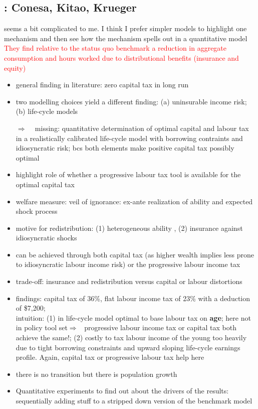 \documentclass[12pt]{article}
\newcommand{\ar}{$\Rightarrow$ \ }
\newcommand{\tr}[1]{\textcolor{red}{#1}}
\begin{document}
\subsection{\cite{Conesa2009TaxingAll}: Conesa, Kitao, Krueger
} \textcolor{sonja}{seems a bit complicated to me. I think I prefer simpler models to highlight one mechanism and then see how the mechanism spells out in a quantitative model}\\
\tr{They find relative to the status quo benchmark a reduction in aggregate consumption and hours worked due to distributional benefits (insurance and equity)}
\begin{itemize}
\item general finding in literature: zero capital tax in long run
\item two modelling choices yield a different finding: (a) uninsurable income risk; (b) life-cycle models
\item[\ar] missing: quantitative determination of optimal capital and labour tax in a realistically calibrated life-cycle model with borrowing contraints and idiosyncratic risk; bcs both elements make positive capital tax possibly optimal
\item highlight role of whether a progressive labour tax tool is available for the optimal capital tax
\item welfare measure: veil of ignorance: ex-ante realization of ability and expected shock process
\item motive for redistribution: (1) heterogeneous ability , (2) insurance against idiosyncratic shocks
\item can be achieved through both capital tax (as higher wealth implies less prone to idiosyncratic labour income risk) or the progressive labour income tax
\item trade-off: insurance and redistribution versus capital or labour distortions
\item findings: capital tax of 36\%, flat labour income tax of 23\% with a deduction of \$7,200; \\
intuition: (1) in life-cycle model optimal to base labour tax on \textbf{age}; here not in policy tool set\ar progressive labour income tax or capital tax both achieve the same!;  (2) costly to tax labour income of the young too heavily due to tight borrowing constraints and upward sloping life-cycle earnings profile. Again, capital tax or progressive labour tax help here
\item there is no transition but there is population growth 
\item Quantitative experiments to find out about the drivers of the results: sequentially adding stuff to a stripped down version of the benchmark model

\end{itemize}
\end{document}
